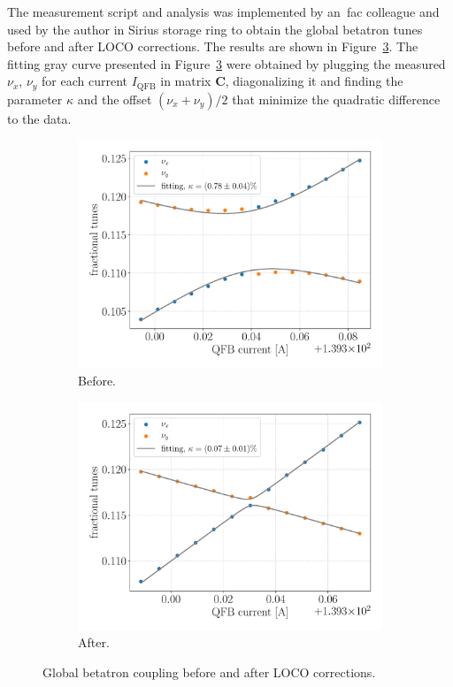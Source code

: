 The measurement script and analysis was implemented by an~\gls{fac} colleague and used by the author in Sirius storage ring to obtain the global betatron tunes before and after LOCO corrections. The results are shown in Figure~\ref{fig:global_coupling}. The fitting gray curve presented in Figure~\ref{fig:global_coupling} were obtained by plugging the measured $\nu_x$, $\nu_y$ for each current $I_{\mathrm{QFB}}$ in matrix $\mathbf{C}$, diagonalizing it and finding the parameter $\kappa$ and the offset $(\nu_x+\nu_y)/2$ that minimize the quadratic difference to the data.
\begin{figure}
\centering
\begin{subfigure}[t]{0.49\textwidth}
\includegraphics[width=1.0\textwidth]{figures/coupling_before_loco_grid_filter.pdf}
    \caption{Before.}
    \label{subfig:coup_before}
\end{subfigure}
 \begin{subfigure}[t]{0.49\textwidth}
\includegraphics[width=1.0\textwidth]{figures/coupling_after_loco_grid_filter.pdf}
    \caption{After.}
    \label{subfig:coup_after}
\end{subfigure}
\caption{Global betatron coupling before and after LOCO corrections.}
\label{fig:global_coupling}
\end{figure}
